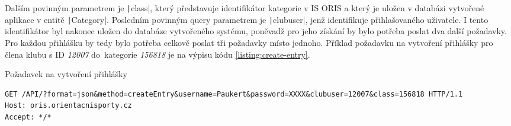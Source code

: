Dalším povinným parametrem je \texttt|class|, který představuje identifikátor kategorie v IS ORIS a který je uložen v databázi vytvořené aplikace v entitě \texttt|Category|. Posledním povinným query parametrem je \texttt|clubuser|, jenž identifikuje přihlašovaného uživatele. I tento identifikátor byl nakonec uložen do databáze vytvořeného systému, poněvadž pro jeho získání by bylo potřeba poslat dva další požadavky. Pro každou přihlášku by tedy bylo potřeba celkově poslat tři požadavky místo jednoho. Příklad požadavku na vytvoření přihlášky pro člena klubu s ID \emph{12007} do~kategorie \emph{156818} je na výpisu kódu \ref{listing:create-entry}.

\begin{listing}[h]
    \caption{Požadavek na vytvoření přihlášky}\label{listing:create-entry}
    \begin{verbatim}
GET /API/?format=json&method=createEntry&username=Paukert&password=XXXX&clubuser=12007&class=156818 HTTP/1.1
Host: oris.orientacnisporty.cz
Accept: */*
    \end{verbatim}
\end{listing}
\vspace{-6mm}
